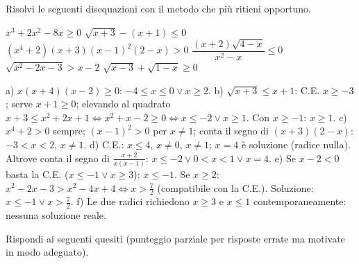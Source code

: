 \documentclass[10pt]{article}
\begin{document}

\testheader[title={Equazioni e disequazioni}]

\exercise Risolvi le seguenti disequazioni con il metodo che più ritieni opportuno.

\begin{parts}[cols=2, stretch=1.5]
  \itemx[pts=1] $x^3 + 2x^2 - 8x \geq 0$
  \itemx[pts=1] $\sqrt{x + 3} - (x + 1) \leq 0$
  \itemx[pts=1] $(x^4 + 2)(x + 3)(x - 1)^2(2 - x) > 0$
  \itemx[pts=1] $\dfrac{(x + 2)\sqrt{4 - x}}{x^2 - x} \leq 0$
  \itemx[pts=1, diff=3] $\sqrt{x^2 - 2x - 3} > x - 2$
  \itemx[pts=1] $\sqrt{x - 3} + \sqrt{1 - x} \geq 0$
\end{parts}
\exercisescore

\begin{solution}
a) $x(x+4)(x-2) \geq 0$: $-4 \leq x \leq 0 \lor x \geq 2$.
b) $\sqrt{x+3} \leq x + 1$: C.E. $x \geq -3$; serve $x + 1 \geq 0$; elevando al quadrato
$x + 3 \leq x^2 + 2x + 1 \iff x^2 + x - 2 \geq 0 \iff x \leq -2 \lor x \geq 1$. Con $x \geq -1$: $x \geq 1$.
c) $x^4 + 2 > 0$ sempre; $(x-1)^2 > 0$ per $x \neq 1$; conta il segno di $(x+3)(2-x)$:
$-3 < x < 2$, $x \neq 1$.
d) C.E.: $x \leq 4$, $x \neq 0$, $x \neq 1$; $x = 4$ è soluzione (radice nulla). Altrove conta il segno di
$\frac{x+2}{x(x-1)}$: $x \leq -2 \lor 0 < x < 1 \lor x = 4$.
e) Se $x - 2 < 0$ basta la C.E. ($x \leq -1 \lor x \geq 3$): $x \leq -1$. Se $x \geq 2$:
$x^2 - 2x - 3 > x^2 - 4x + 4 \iff x > \frac72$ (compatibile con la C.E.). Soluzione: $x \leq -1 \lor x > \frac72$.
f) Le due radici richiedono $x \geq 3$ e $x \leq 1$ contemporaneamente: nessuna soluzione reale.
\end{solution}

\exercise[motivation=2] Rispondi ai seguenti quesiti (punteggio parziale per risposte errate ma motivate in modo adeguato).
\legendamotivazione
\end{document}

